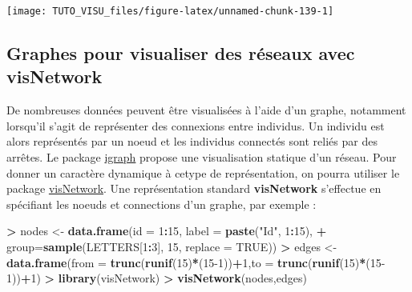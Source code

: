 \documentclass[]{article}
\newenvironment{Shaded}{\begin{snugshade}}{\end{snugshade}}
\newcommand{\DataTypeTok}[1]{\textcolor[rgb]{0.13,0.29,0.53}{#1}}
\newcommand{\DecValTok}[1]{\textcolor[rgb]{0.00,0.00,0.81}{#1}}
\newcommand{\KeywordTok}[1]{\textcolor[rgb]{0.13,0.29,0.53}{\textbf{#1}}}
\newcommand{\NormalTok}[1]{#1}
\newcommand{\OperatorTok}[1]{\textcolor[rgb]{0.81,0.36,0.00}{\textbf{#1}}}
\newcommand{\OtherTok}[1]{\textcolor[rgb]{0.56,0.35,0.01}{#1}}
\newcommand{\StringTok}[1]{\textcolor[rgb]{0.31,0.60,0.02}{#1}}
\theoremstyle{definition}
\theoremstyle{definition}
\theoremstyle{definition}
\theoremstyle{remark}
\begin{document}
\begin{center}\texttt{[image: TUTO\_VISU\_files/figure-latex/unnamed-chunk-139-1]} \end{center}

\hypertarget{graphes-pour-visualiser-des-ruxe9seaux-avec-visnetwork}{%
\subsection{Graphes pour visualiser des réseaux avec visNetwork}\label{graphes-pour-visualiser-des-ruxe9seaux-avec-visnetwork}}

De nombreuses données peuvent être visualisées à l'aide d'un graphe, notamment lorsqu'il s'agit de représenter des connexions entre individus. Un individu est alors représentés par un noeud et les individus connectés sont reliés par des arrêtes. Le package \href{http://kateto.net/networks-r-igraph}{igraph} propose une visualisation statique d'un réseau. Pour donner un caractère dynamique à cetype de représentation, on pourra utiliser le package \href{https://datastorm-open.github.io/visNetwork/interaction.html}{visNetwork}. Une représentation standard \textbf{visNetwork} s'effectue en spécifiant les noeuds et connections d'un graphe, par exemple :

\begin{Shaded}
\begin{Highlighting}[]
\OperatorTok{>}\StringTok{ }\NormalTok{nodes <-}\StringTok{ }\KeywordTok{data.frame}\NormalTok{(}\DataTypeTok{id =} \DecValTok{1}\OperatorTok{:}\DecValTok{15}\NormalTok{, }\DataTypeTok{label =} \KeywordTok{paste}\NormalTok{(}\StringTok{"Id"}\NormalTok{, }\DecValTok{1}\OperatorTok{:}\DecValTok{15}\NormalTok{),}
\OperatorTok{+}\StringTok{                     }\DataTypeTok{group=}\KeywordTok{sample}\NormalTok{(LETTERS[}\DecValTok{1}\OperatorTok{:}\DecValTok{3}\NormalTok{], }\DecValTok{15}\NormalTok{, }\DataTypeTok{replace =} \OtherTok{TRUE}\NormalTok{))}
\OperatorTok{>}\StringTok{ }\NormalTok{edges <-}\StringTok{ }\KeywordTok{data.frame}\NormalTok{(}\DataTypeTok{from =} \KeywordTok{trunc}\NormalTok{(}\KeywordTok{runif}\NormalTok{(}\DecValTok{15}\NormalTok{)}\OperatorTok{*}\NormalTok{(}\DecValTok{15-1}\NormalTok{))}\OperatorTok{+}\DecValTok{1}\NormalTok{,}\DataTypeTok{to =} \KeywordTok{trunc}\NormalTok{(}\KeywordTok{runif}\NormalTok{(}\DecValTok{15}\NormalTok{)}\OperatorTok{*}\NormalTok{(}\DecValTok{15-1}\NormalTok{))}\OperatorTok{+}\DecValTok{1}\NormalTok{)}
\OperatorTok{>}\StringTok{ }\KeywordTok{library}\NormalTok{(visNetwork)}
\OperatorTok{>}\StringTok{ }\KeywordTok{visNetwork}\NormalTok{(nodes,edges)}
\end{Highlighting}
\end{Shaded}
\end{document}
